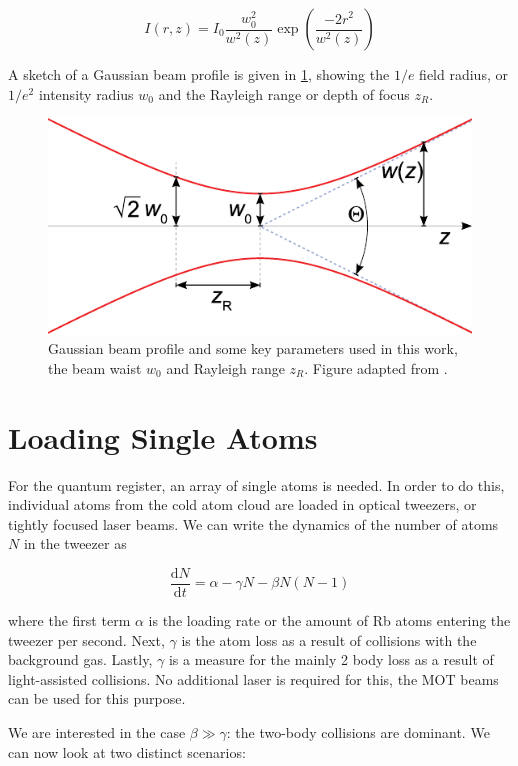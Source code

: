 \begin{equation}\label{GaussianBeamIntensity}
	I(r,z) = I_0 \frac{w_0^2}{w^2(z)} \exp{\left(\frac{-2r^2}{w^2(z)}\right)}
\end{equation}

A sketch of a Gaussian beam profile is given in \cref{fig:GaussianBeam}, showing the $1/e$ field radius, or $1/e^2$ intensity radius $w_0$ and the Rayleigh range or depth of focus $z_R$. 

\begin{figure}
	\centering
	\includegraphics[width=0.4\linewidth]{figures/GaussianBeam.pdf}
	\caption{Gaussian beam profile and some key parameters used in this work, the beam waist $w_0$ and Rayleigh range $z_R$. Figure adapted from \cite{Hermans2009}.}
	\label{fig:GaussianBeam}
\end{figure}


\section{Loading Single Atoms}\label{sec:LoadingAtoms}

For the quantum register, an array of single atoms is needed. In order to do this, individual atoms from the cold atom cloud are loaded in optical tweezers, or tightly focused laser beams. We can write the dynamics of the number of atoms $N$ in the tweezer as \cite{Schlosser2002}

\begin{equation}\label{LoadingTweezer}
	\frac{\text{d}N}{\text{d}t} = \alpha - \gamma N - \beta N(N-1)
\end{equation}

where the first term $\alpha$ is the loading rate or the amount of Rb atoms entering the tweezer per second. Next, $\gamma$ is the atom loss as a result of collisions with the background gas. Lastly, $\gamma$ is a measure for the mainly 2 body loss as a result of light-assisted collisions. No additional laser is required for this, the MOT beams can be used for this purpose.  

We are interested in the case $\beta \gg \gamma$: the two-body collisions are dominant. We can now look at two distinct scenarios:

